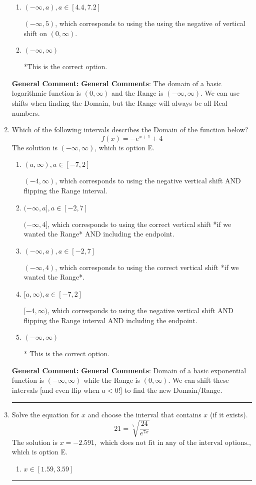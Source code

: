 \documentclass{extbook}[14pt]
\newcommand{\litem}[1]{\item #1

\rule{\textwidth}{0.4pt}}
\begin{document}
\begin{enumerate}
{\begin{enumerate}[label=\Alph*.]
$(-\infty, -5)$, which corresponds to using the vertical shift while the Range is $(-\infty, \infty)$.
\item \( (-\infty, a), a \in [4.4, 7.2] \)

$(-\infty, 5)$, which corresponds to using the using the negative of vertical shift on $(0, \infty)$.
\item \( (-\infty, \infty) \)

*This is the correct option.
\end{enumerate}

\textbf{General Comment:} \textbf{General Comments}: The domain of a basic logarithmic function is $(0, \infty)$ and the Range is $(-\infty, \infty)$. We can use shifts when finding the Domain, but the Range will always be all Real numbers.
}
\litem{
Which of the following intervals describes the Domain of the function below?
\[ f(x) = -e^{x+1}+4 \]The solution is \( (-\infty, \infty) \), which is option E.\begin{enumerate}[label=\Alph*.]
\item \( (a, \infty), a \in [-7, 2] \)

$(-4, \infty)$, which corresponds to using the negative vertical shift AND flipping the Range interval.
\item \( (-\infty, a], a \in [-2, 7] \)

$(-\infty, 4]$, which corresponds to using the correct vertical shift *if we wanted the Range* AND including the endpoint.
\item \( (-\infty, a), a \in [-2, 7] \)

$(-\infty, 4)$, which corresponds to using the correct vertical shift *if we wanted the Range*.
\item \( [a, \infty), a \in [-7, 2] \)

$[-4, \infty)$, which corresponds to using the negative vertical shift AND flipping the Range interval AND including the endpoint.
\item \( (-\infty, \infty) \)

* This is the correct option.
\end{enumerate}

\textbf{General Comment:} \textbf{General Comments}: Domain of a basic exponential function is $(-\infty, \infty)$ while the Range is $(0, \infty)$. We can shift these intervals [and even flip when $a<0$!] to find the new Domain/Range.
}
\litem{
 Solve the equation for $x$ and choose the interval that contains $x$ (if it exists).
\[  21 = \sqrt[7]{\frac{24}{e^{7x}}} \]The solution is \( x = -2.591, \text{ which does not fit in any of the interval options.} \), which is option E.\begin{enumerate}[label=\Alph*.]
\item \( x \in [1.59, 3.59] \)


\end{enumerate}}
\end{enumerate}
\end{document}
